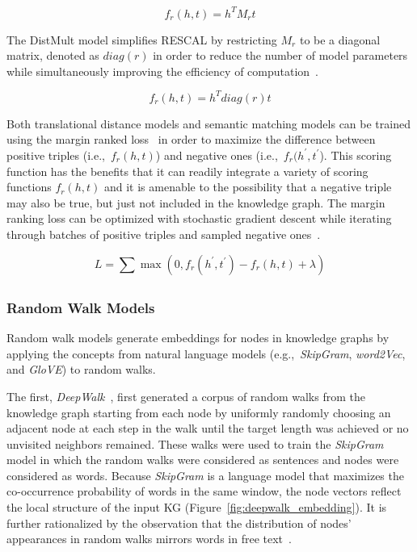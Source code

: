 \begin{equation}\label{eq:rescal_scoring_function}
    f_r(h,t) = h^{T} M_{r} t
\end{equation}

The DistMult model simplifies RESCAL by restricting $M_r$ to be a diagonal matrix, denoted as $diag(r)$ in order to reduce the number of model parameters while simultaneously improving the efficiency of computation~\cite{Yang2014}.

\begin{equation} \label{eq:distmult_scoring_function}
    f_r(h,t) = h^{T} diag(r) t
\end{equation}

Both translational distance models and semantic matching models can be trained using the margin ranked loss~\cite{Nickel2016,Dettmers2017} in order to maximize the difference between positive triples (i.e.,~$f_r(h,t)$) and negative ones (i.e.,~$f_r(h^{'},t^{'}$).
This scoring function has the benefits that it can readily integrate a variety of scoring functions $f_r(h, t)$ and it is amenable to the possibility that a negative triple may also be true, but just not included in the knowledge graph.
The margin ranking loss can be optimized with stochastic gradient descent while iterating through batches of positive triples and sampled negative ones~\cite{Bottou2010}.

\begin{equation}\label{eq:margin_ranked_loss}
    L = \sum_{}^{}\max(0, f_r(h^{'},t^{'}) - f_r(h,t) + \lambda)
\end{equation}

\subsubsection{Random Walk Models}

Random walk models generate embeddings for nodes in knowledge graphs by applying the concepts from natural language models (e.g.,~\textit{SkipGram}, \textit{word2Vec}, and \textit{GloVE}) to random walks.

The first, \textit{DeepWalk}~\cite{Perozzi2014}, first generated a corpus of random walks from the knowledge graph starting from each node by uniformly randomly choosing an adjacent node at each step in the walk until the target length was achieved or no unvisited neighbors remained.
These walks were used to train the \textit{SkipGram}~\cite{Mikolov2013} model in which the random walks were considered as sentences and nodes were considered as words.
Because \textit{SkipGram} is a language model that maximizes the co-occurrence probability of words in the same window, the node vectors reflect the local structure of the input \ac{KG} (Figure~\ref{fig:deepwalk_embedding}).
It is further rationalized by the observation that the distribution of nodes' appearances in random walks mirrors words in free text~\cite{Perozzi2014}.


